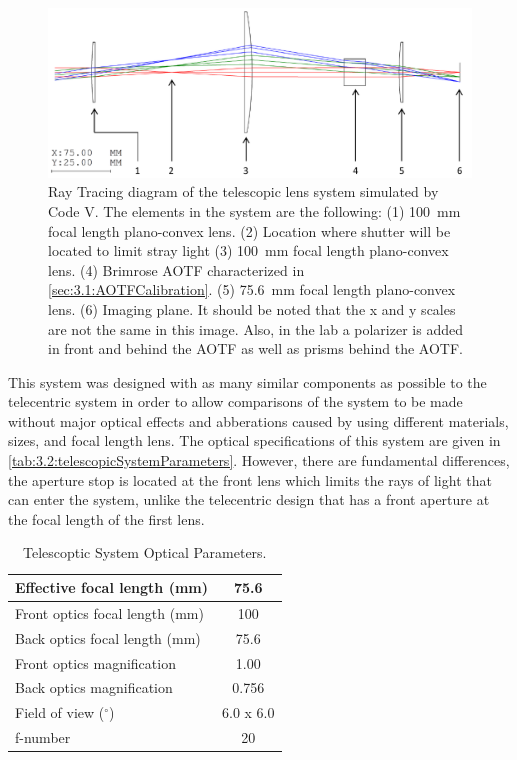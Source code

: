 \begin{figure}[h!]
    \includegraphics[width=1.0\textwidth]{./Images/3-2-TelescopicRayTracing.pdf}
    \caption[ALI Telescopic Design Prototype]{Ray Tracing diagram of the telescopic lens system simulated by Code V. The elements in the system are the following: (1) 100~mm focal length plano-convex lens. (2) Location where shutter will be located to limit stray light (3) 100~mm focal length plano-convex lens. (4) Brimrose AOTF characterized in \autoref{sec:3.1:AOTFCalibration}. (5) 75.6~mm focal length plano-convex lens. (6) Imaging plane. It should be noted that the x and y scales are not the same in this image. Also, in the lab a polarizer is added in front and behind the AOTF as well as prisms behind the AOTF.}
    \label{fig:3.2:telescopicRayTracing}
\end{figure}

This system was designed with as many similar components as possible to the telecentric system in order to allow comparisons of the system to be made without major optical effects and abberations caused by using different materials, sizes, and focal length lens. The optical specifications of this system are given in \autoref{tab:3.2:telescopicSystemParameters}. However, there are fundamental differences, the aperture stop is located at the front lens which limits the rays of light that can enter the system, unlike the telecentric design that has a front aperture at the focal length of the first lens.


\begin{table}[h!]
    \begin{center}
    \begin{tabular}{|l|c|}
    \hline
    Effective focal length (mm) & 75.6 \\
    \hline
    Front optics focal length (mm) & 100 \\
    \hline
    Back optics focal length (mm) & 75.6 \\
    \hline
    Front optics magnification & 1.00 \\
    \hline
    Back optics magnification & 0.756 \\
    \hline
    Field of view ($^{\circ}$) & 6.0 x 6.0 \\
    \hline
    f-number & 20 \\
    \hline
    \end{tabular}
    \end{center}
    \caption{Telescoptic System Optical Parameters.}
    \label{tab:3.2:telescopicSystemParameters}
\end{table}

